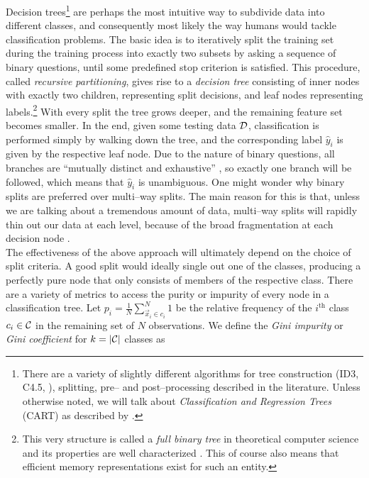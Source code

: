 Decision trees\footnote{There are a variety of slightly different algorithms for tree construction (ID3, C4.5, \etc), splitting, pre-- and post--processing described in the literature. Unless otherwise noted, we will talk about \emph{Classification and Regression Trees} (CART) as described by \citet{breiman1984}.} \citep{breiman1984} are perhaps the most intuitive way to subdivide data into different classes, and consequently most likely the way humans would tackle classification problems. The basic idea is to iteratively split the training set during the training process into exactly two subsets by asking a sequence of binary questions, until some predefined stop criterion is satisfied. This procedure, called \emph{recursive partitioning}, gives rise to a \emph{decision tree} consisting of inner nodes with exactly two children, representing split decisions, and leaf nodes representing labels.\footnote{This very structure is called a \emph{full binary tree} in  theoretical computer science and its properties are well characterized \citep{knuth1981}. This of course also means that efficient memory representations exist for such an entity.} With every split the tree grows deeper, and the remaining feature set becomes smaller. In the end, given some testing data $\mathcal{D}$, classification is performed simply by walking down the tree, and the corresponding label $\hat y_i$ is given by the respective leaf node. Due to the nature of binary questions, all branches are ``mutually distinct and exhaustive'' \citep{duda2001}, so exactly one branch will be followed, which means that $\hat y_i$ is unambiguous. One might wonder why binary splits are preferred over multi--way splits. The main reason for this is that, unless we are talking about a tremendous amount of data, multi--way splits will rapidly thin out our data at each level, because of the broad fragmentation at each decision node \citep{hastie2001}. %
\\

The effectiveness of the above approach will ultimately depend on the choice of split criteria. A good split would ideally single out one of the classes, producing a perfectly pure node that only consists of members of the respective class. There are a variety of metrics to access the purity or impurity of every node in a classification tree. Let $p_i = \frac{1}{N} \sum\limits_{\vec x_i \in c_i}^N 1$ be the relative frequency of the $i^{\text{th}}$ class $c_i \in \mathcal{C}$ in the remaining set of $N$ observations. We define the \emph{Gini impurity} or \emph{Gini coefficient} for $k = |\mathcal{C}|$ classes as

